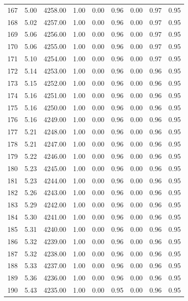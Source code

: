 \documentclass{article}\usepackage[]{graphicx}\usepackage[]{color}
\begin{document}
\begin{longtable}{rrrrrrrrr}
  167 & 5.00 & 4258.00 & 1.00 & 0.00 & 0.96 & 0.00 & 0.97 & 0.95 \\ 
  168 & 5.02 & 4257.00 & 1.00 & 0.00 & 0.96 & 0.00 & 0.97 & 0.95 \\ 
  169 & 5.06 & 4256.00 & 1.00 & 0.00 & 0.96 & 0.00 & 0.97 & 0.95 \\ 
  170 & 5.06 & 4255.00 & 1.00 & 0.00 & 0.96 & 0.00 & 0.97 & 0.95 \\ 
  171 & 5.10 & 4254.00 & 1.00 & 0.00 & 0.96 & 0.00 & 0.97 & 0.95 \\ 
  172 & 5.14 & 4253.00 & 1.00 & 0.00 & 0.96 & 0.00 & 0.96 & 0.95 \\ 
  173 & 5.15 & 4252.00 & 1.00 & 0.00 & 0.96 & 0.00 & 0.96 & 0.95 \\ 
  174 & 5.16 & 4251.00 & 1.00 & 0.00 & 0.96 & 0.00 & 0.96 & 0.95 \\ 
  175 & 5.16 & 4250.00 & 1.00 & 0.00 & 0.96 & 0.00 & 0.96 & 0.95 \\ 
  176 & 5.16 & 4249.00 & 1.00 & 0.00 & 0.96 & 0.00 & 0.96 & 0.95 \\ 
  177 & 5.21 & 4248.00 & 1.00 & 0.00 & 0.96 & 0.00 & 0.96 & 0.95 \\ 
  178 & 5.21 & 4247.00 & 1.00 & 0.00 & 0.96 & 0.00 & 0.96 & 0.95 \\ 
  179 & 5.22 & 4246.00 & 1.00 & 0.00 & 0.96 & 0.00 & 0.96 & 0.95 \\ 
  180 & 5.23 & 4245.00 & 1.00 & 0.00 & 0.96 & 0.00 & 0.96 & 0.95 \\ 
  181 & 5.23 & 4244.00 & 1.00 & 0.00 & 0.96 & 0.00 & 0.96 & 0.95 \\ 
  182 & 5.26 & 4243.00 & 1.00 & 0.00 & 0.96 & 0.00 & 0.96 & 0.95 \\ 
  183 & 5.29 & 4242.00 & 1.00 & 0.00 & 0.96 & 0.00 & 0.96 & 0.95 \\ 
  184 & 5.30 & 4241.00 & 1.00 & 0.00 & 0.96 & 0.00 & 0.96 & 0.95 \\ 
  185 & 5.31 & 4240.00 & 1.00 & 0.00 & 0.96 & 0.00 & 0.96 & 0.95 \\ 
  186 & 5.32 & 4239.00 & 1.00 & 0.00 & 0.96 & 0.00 & 0.96 & 0.95 \\ 
  187 & 5.32 & 4238.00 & 1.00 & 0.00 & 0.96 & 0.00 & 0.96 & 0.95 \\ 
  188 & 5.33 & 4237.00 & 1.00 & 0.00 & 0.96 & 0.00 & 0.96 & 0.95 \\ 
  189 & 5.36 & 4236.00 & 1.00 & 0.00 & 0.96 & 0.00 & 0.96 & 0.95 \\ 
  190 & 5.43 & 4235.00 & 1.00 & 0.00 & 0.95 & 0.00 & 0.96 & 0.95 \\ 

\end{longtable}
\end{document}
